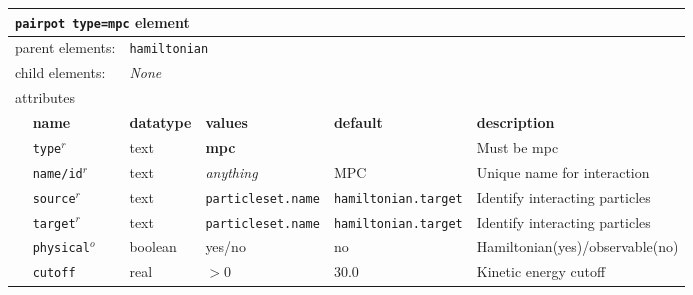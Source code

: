 \FloatBarrier
\begin{table}[h]
\begin{center}
\begin{tabularx}{\textwidth}{l l l l l X }
\hline
\multicolumn{6}{l}{\texttt{pairpot type=mpc} element} \\
\hline
\multicolumn{2}{l}{parent elements:} & \multicolumn{4}{l}{\texttt{hamiltonian}}\\
\multicolumn{2}{l}{child  elements:} & \multicolumn{4}{l}{\textit{None}}\\
\multicolumn{2}{l}{attributes}  & \multicolumn{4}{l}{}\\
   &   \bfseries name     & \bfseries datatype & \bfseries values & \bfseries default   & \bfseries description \\
   & \texttt{type}$^r$    &  text              & \textbf{mpc}     &                     & Must be mpc         \\
   & \texttt{name/id}$^r$ &  text              & \textit{anything}&  MPC                & Unique name for interaction \\
   & \texttt{source}$^r$  &  text              & \texttt{particleset.name} &\texttt{hamiltonian.target}& Identify interacting particles\\
   & \texttt{target}$^r$  &  text              & \texttt{particleset.name} &\texttt{hamiltonian.target}& Identify interacting particles  \\
   & \texttt{physical}$^o$&  boolean           & yes/no           & no                  & Hamiltonian(yes)/observable(no) \\
   &  \texttt{cutoff}     &  real              & $>0$             & 30.0                & Kinetic energy cutoff \\
  \hline
\end{tabularx}
\end{center}
\end{table}
